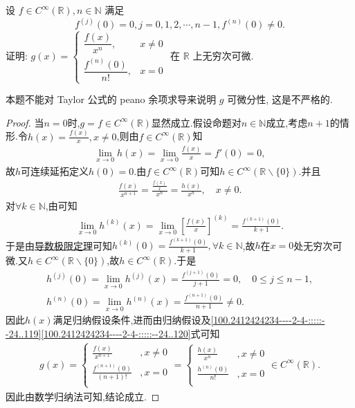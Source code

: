 \documentclass[../../main.tex]{subfiles}%
\begin{document}
\begin{example}
设 $f \in C^\infty(\mathbb{R}), n \in \mathbb{N}$ 满足
\[
f^{(j)}(0) = 0, j = 0, 1, 2, \cdots, n - 1, f^{(n)}(0) \neq 0.
\]
证明: \( g(x) = \begin{cases} 
\dfrac{f(x)}{x^n}, & x \neq 0 \\
\dfrac{f^{(n)}(0)}{n!}, & x = 0 
\end{cases} \) 在 $\mathbb{R}$ 上无穷次可微.
\end{example}
\begin{note}
本题不能对 Taylor 公式的 peano 余项求导来说明 $g$ 可微分性, 这是不严格的.
\end{note}
\begin{proof}

当$n=0$时,$g=f\in C^{\infty}(\mathbb{R})$显然成立.假设命题对$n\in \mathbb{N}$成立,考虑$n+1$的情形.令$h(x)=\frac{f(x)}{x},x\neq 0$,则由$f\in C^{\infty}(\mathbb{R})$知
\begin{align*}
\lim_{x\to 0}h(x)=\lim_{x\to 0}\frac{f(x)}{x} = f'(0)=0,
\end{align*}
故$h$可连续延拓定义$h(0)=0$.由$f\in C^{\infty}(\mathbb{R})$可知$h\in C^{\infty}(\mathbb{R}\backslash \{0\})$.并且
\begin{align}
\frac{f(x)}{x^{n+1}}=\frac{\frac{f(x)}{x}}{x^n}=\frac{h(x)}{x^n},\quad x\neq 0. \label{100.2412424234----2-4-:::::--24..119}
\end{align}
对$\forall k\in \mathbb{N}$,由可知
\begin{align*}
\lim_{x\rightarrow 0}h^{(k)}(x)=\lim_{x\rightarrow 0}\left[ \frac{f(x)}{x} \right]^{(k)}=\frac{f^{(k+1)}(0)}{k+1}.
\end{align*}
于是由\hyperref[theorem:单侧导数极限定理]{导数极限定理}可知$h^{(k)}(0)=\frac{f^{(k+1)}(0)}{k+1},\forall k\in \mathbb{N}$,故$h$在$x=0$处无穷次可微.又$h\in C^{\infty}(\mathbb{R}\backslash \{0\})$,故$h\in C^{\infty}(\mathbb{R})$.于是
\begin{gather}
h^{(j)}(0)=\lim_{x\rightarrow 0}h^{(j)}(x)=\frac{f^{(j+1)}(0)}{j+1}=0,\quad 0\leqslant j\leqslant n-1,\nonumber \\
h^{(n)}(0)=\lim_{x\rightarrow 0}h^{(n)}(x)=\frac{f^{(n+1)}(0)}{n+1}\ne 0. \label{100.2412424234----2-4-:::::--24..120}
\end{gather}
因此$h(x)$满足归纳假设条件,进而由归纳假设及\eqref{100.2412424234----2-4-:::::--24..119}\eqref{100.2412424234----2-4-:::::--24..120}式可知
\begin{align*}
g(x)=\begin{cases}
\frac{f(x)}{x^{n+1}}&,x\ne 0\\
\frac{f^{(n+1)}(0)}{(n+1)!}&,x=0\\
\end{cases}=\begin{cases}
\frac{h(x)}{x^n}&,x\ne 0\\
\frac{h^{(n)}(0)}{n!}&,x=0\\
\end{cases}\in C^{\infty}(\mathbb{R}).
\end{align*}
因此由数学归纳法可知,结论成立.

\end{proof}
\end{document}
